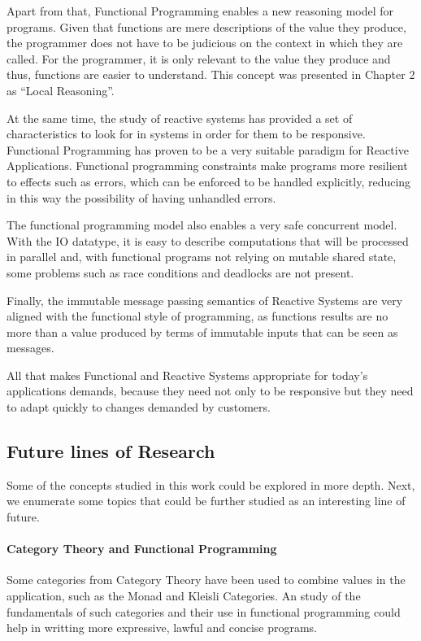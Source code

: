\documentclass[../main.tex]{subfiles}
\begin{document}
Apart from that, Functional Programming enables a new reasoning model for
programs. Given that functions are mere descriptions of the value they produce,
the programmer does not have to be judicious on the context in which they are
called. For the programmer, it is only relevant to the value they produce and thus,
functions are easier to understand. This concept was presented in Chapter 2 as
``Local Reasoning''.

At the same time, the study of reactive systems has provided a set of
characteristics to look for in systems in order for them to be responsive. Functional Programming
has proven to be a very suitable paradigm for Reactive Applications. Functional programming
constraints make programs more resilient to effects
such as errors, which can be enforced to be handled explicitly, reducing in this way
the possibility of having unhandled errors.

The functional programming model also enables a very safe concurrent
model. With the IO datatype, it is easy to describe computations that will be
processed in parallel and, with functional programs not relying on mutable shared
state, some problems such as race conditions and deadlocks are not present.

Finally, the immutable message passing semantics of Reactive Systems are very
aligned with the functional style of programming, as functions results are no more than
a value produced by terms of immutable inputs that can be seen as messages.

All that makes Functional and Reactive Systems appropriate for today's
applications demands, because they need not only to be responsive but they need to adapt quickly
to changes demanded by customers.

\subsection{Future lines of Research}
Some of the concepts studied in this work could be explored in more depth. Next, we enumerate 
some topics that could be further studied as an interesting line of future.

\paragraph{Category Theory and Functional Programming}

Some categories from Category Theory have been used to combine values in the
application, such as the Monad and Kleisli Categories. An study of the
fundamentals of such categories and their use in functional programming could
help in writting more expressive, lawful and concise programs.
\end{document}
